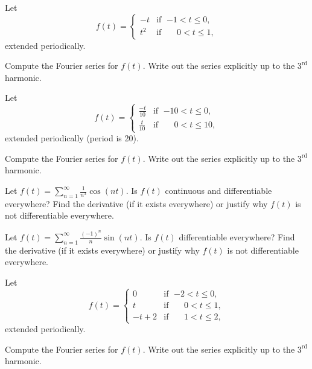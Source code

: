 \begin{exercise}
Let
\begin{equation*}
f(t) =
\begin{cases}
-t & \text{if } \; {-1} < t \leq 0 , \\
t^2 & \text{if } \; \phantom{-}0 < t \leq  1 ,
\end{cases}
\end{equation*}
extended periodically.
\begin{tasks}
\task Compute the Fourier series for $f(t)$.
\task Write out the series explicitly up to the $3^{\text{rd}}$ harmonic.
\end{tasks}
\end{exercise}

\begin{exercise}
Let
\begin{equation*}
f(t) =
\begin{cases}
\frac{-t}{10} & \text{if } \; {-10} < t \leq 0 , \\
\frac{t}{10} & \text{if } \; \phantom{-1}0 < t \leq  10 ,
\end{cases}
\end{equation*}
extended periodically (period is 20).
\begin{tasks}
\task Compute the Fourier series for $f(t)$.
\task Write out the series explicitly up to the $3^{\text{rd}}$ harmonic.
\end{tasks}
\end{exercise}

\begin{exercise}
Let $f(t) = \sum_{n=1}^\infty \frac{1}{n^3} \cos (n t)$.  Is $f(t)$
continuous and differentiable everywhere?  Find the derivative (if it exists
everywhere)
or justify why $f(t)$ is not differentiable everywhere.
\end{exercise}

\begin{exercise}
Let $f(t) = \sum_{n=1}^\infty \frac{{(-1)}^n}{n} \sin (n t)$.  Is $f(t)$
differentiable everywhere?  Find the derivative (if it exists everywhere) or
justify why $f(t)$ is not differentiable everywhere.
\end{exercise}

\begin{exercise}
Let
\begin{equation*}
f(t) =
\begin{cases}
0 & \text{if } \; {-2} < t \leq 0, \\
t & \text{if } \; \phantom{-}0 < t \leq 1, \\
-t+2 & \text{if } \; \phantom{-}1 < t \leq 2,
\end{cases}
\end{equation*}
extended periodically.
\begin{tasks}
\task Compute the Fourier series for $f(t)$.
\task Write out the series explicitly up to the $3^{\text{rd}}$ harmonic.
\end{tasks}
\end{exercise}


